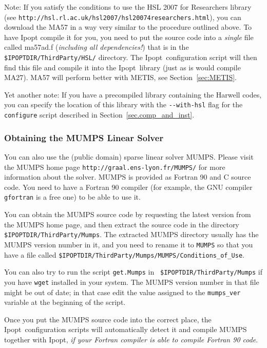 \documentclass[10pt]{article}
\newcommand{\Ipopt}{{\sc Ipopt}}
\begin{document}
Note: If you satisfy the conditions to use the HSL 2007 for
Researchers library\\ (see
\texttt{http://hsl.rl.ac.uk/hsl2007/hsl20074researchers.html}), you
can download the MA57 in a way very similar to the procedure outlined
above.  To have Ipopt compile it for you, you need to put the source
code into a \emph{single} file called ma57ad.f (\emph{including all
  dependencies!}) that is in the {\tt \$IPOPTDIR/ThirdParty/HSL/}
directory. The \Ipopt\ configuration script will then find this file
and compile it into the \Ipopt\ library (just as is would compile
MA27).  MA57 will perform better with METIS, see
Section~\ref{sec:METIS}.

Yet another note: If you have a precompiled library containing the
Harwell codes, you can specify the location of this library with the
\verb|--with-hsl| flag for the {\tt configure} script described in
Section~\ref{sec.comp_and_inst}.

\subsubsection{Obtaining the MUMPS Linear Solver}\label{sec:MUMPS}

You can also use the (public domain) sparse linear solver MUMPS.
Please visit the MUMPS home page {\tt http://graal.ens-lyon.fr/MUMPS/}
for more information about the solver. MUMPS is provided as Fortran 90
and C source code.  You need to have a Fortran 90 compiler (for
example, the GNU compiler {\tt gfortran} is a free one) to be able to
use it.

You can obtain the MUMPS source code by requesting the latest version
from the MUMPS home page, and then extract the source code in the
directory {\tt \$IPOPTDIR/ThirdParty/Mumps}.  The extracted MUMPS
directory usually has the MUMPS version number in it, and you need to
rename it to {\tt MUMPS} so that you have a file called
{\tt \$IPOPTDIR/ThirdParty/Mumps/MUMPS/Conditions\_of\_Use}.

You can also try to run the script {\tt get.Mumps} in {\tt
  \$IPOPTDIR/ThirdParty/Mumps} if you have {\tt wget} installed in
your system.  The MUMPS version number in that file might be out of
date; in that case edit the value assigned to the {\tt mumps\_ver}
variable at the beginning of the script.

Once you put the MUMPS source code into the correct place, the \Ipopt\
configuration scripts will automatically detect it and compile MUMPS
together with \Ipopt, \emph{if your Fortran compiler is able to compile
Fortran 90 code}.
\end{document}
